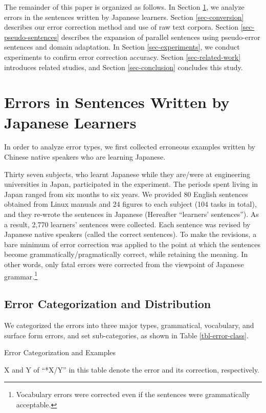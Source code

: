 \documentclass[english]{jnlp_1.4_rep}
\begin{document}
The remainder of this paper is organized as follows. In Section
\ref{sec-particle-errors}, we analyze errors in the sentences written
by Japanese learners. Section \ref{sec-conversion} describes our error
correction method and use of raw text corpora. Section
\ref{sec-pseudo-sentences} describes the expansion of parallel
sentences using pseudo-error sentences and domain adaptation. In
Section \ref{sec-experiments}, we conduct experiments to confirm error
correction accuracy. Section \ref{sec-related-work} introduces related
studies, and Section \ref{sec-conclusion} concludes this study.


\section{Errors in Sentences Written by Japanese Learners}
\label{sec-particle-errors}

In order to analyze error types, we first collected erroneous examples
written by Chinese native speakers who are learning Japanese.


Thirty seven subjects, who learnt Japanese while they are/were at
engineering universities in Japan, participated in the experiment. The
periods spent living in Japan ranged from six months to six years. We
provided 80 English sentences obtained from Linux manuals and 24
figures to each subject (104 tasks in total), and they re-wrote the
sentences in Japanese (Hereafter ``learners' sentences''). As a
result, 2,770 learners' sentences were collected. Each sentence was
revised by Japanese native speakers (called the correct sentences). To
make the revisions, a bare minimum of error correction was applied to
the point at which the sentences become grammatically/pragmatically
correct, while retaining the meaning. In other words, only fatal
errors were corrected from the viewpoint of Japanese
grammar.\footnote{Vocabulary errors were corrected even if the
sentences were grammatically acceptable.}


\subsection{Error Categorization and Distribution}

We categorized the errors into three major types, grammatical,
vocabulary, and surface form errors, and set sub-categories, as shown
in Table \ref{tbl-error-class}.

\begin{table}[t]
\caption{Error Categorization and Examples}
\label{tbl-error-class}

\small
X and Y of ``*X/Y'' in this table denote the error and its correction, respectively.
\par
\end{table}
\end{document}
